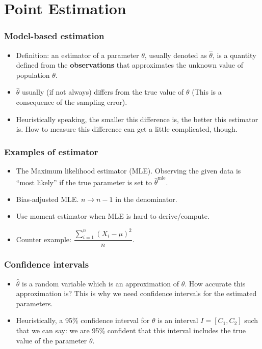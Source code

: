 \section{Point Estimation}

\begin{frame}
  \frametitle{Model-based estimation}
  \begin{itemize}
  \item Definition: an estimator of a parameter $\theta$, usually
    denoted as $\hat{\theta}$, is a quantity defined from the
    \textbf{observations} that \alert{approximates} the unknown value
    of population $\theta$.
  \item $\hat{\theta}$ usually (if not always) differs from the true
    value of $\theta$ (This is a consequence of the sampling
    error).
  \item Heuristically speaking, the smaller this difference is, the
    better this estimator is. How to measure this \alert{difference}
    can get a little complicated, though.
  \end{itemize}
\end{frame}

\begin{frame}
  \frametitle{Examples of estimator}
  \begin{itemize}
  \item The Maximum likelihood estimator (MLE).  Observing the given
    data is ``most likely'' if the true parameter is set to
    $\hat{\theta}^{\mathrm{mle}}$.
  \item Bias-adjusted MLE. $n \to n-1$ in the denominator.
  \item Use moment estimator when MLE is hard to derive/compute.
  \item Counter example: $\dfrac{\sum_{i=1}^{n} (X_i -\mu)^{2}}{n}$.
  \end{itemize}
\end{frame}

\begin{frame}
  \frametitle{Confidence intervals}
  \begin{itemize}
  \item $\hat{\theta}$ is a \alert{random variable} which is an
    approximation of $\theta$. How accurate this approximation is?
    This is why we need confidence intervals for the estimated
    parameters.
  \item Heuristically, a 95\% confidence interval for $\theta$ is an
    interval $I = [C_{1}, C_{2}]$ such that we can say: we are 95\%
    confident that this interval includes the true value of the
    parameter $\theta$.
  \end{itemize}
\end{frame}

